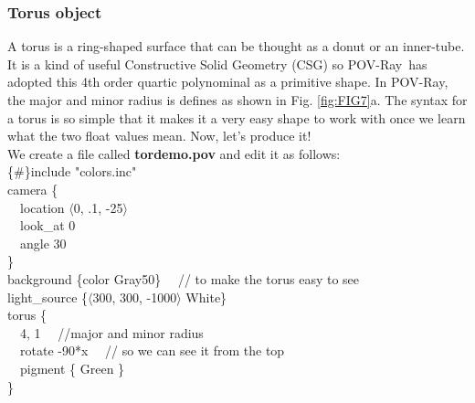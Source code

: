 \documentclass[fleqn,10pt]{wlscirep}
\newcommand*{\PV}{POV-Ray}
\begin{document}
\subsubsection{Torus object}
A torus is a ring-shaped surface that can be thought as a donut or an inner-tube. It is a kind of useful Constructive Solid Geometry (CSG) so \PV~has adopted this 4th order quartic polynominal as a primitive shape. In \PV, the major and minor radius is defines as shown in Fig. \ref{fig:FIG7}a. The syntax for a torus is so simple that it makes it a very easy shape to work with once we learn what the two float values mean. Now, let's produce it!\\
\newline
We create a file called \textbf{tordemo.pov} and edit it as follows:\\
{\color{blue}
\{\#\}include "colors.inc"   \\
camera \{   \\
\ \ location $\langle$0, .1, -25$\rangle$   \\
\ \ look\_at 0   \\
\ \ angle 30    \\
\}   \\
background \{color Gray50\} \ \ // to make the torus easy to see   \\
light\_source \{$\langle$300, 300, -1000$\rangle$ White\}   \\
torus \{   \\
\ \ 4, 1    \ \ //major and minor radius   \\
\ \ rotate -90*x \ \ // so we can see it from the top  \\
\ \ pigment \{ Green \} \\
\}  \\
}\\
\end{document}
